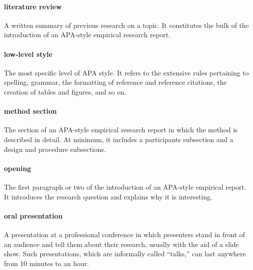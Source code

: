 \documentclass[
]{krantz}
\begin{document}
\hypertarget{literature-review}{%
\paragraph*{literature review}\label{literature-review}}

A written summary of previous research on a topic. It constitutes the bulk of the introduction of an APA-style empirical research report.

\hypertarget{low-level-style}{%
\paragraph*{low-level style}\label{low-level-style}}

The most specific level of APA style. It refers to the extensive rules pertaining to spelling, grammar, the formatting of reference and reference citations, the creation of tables and figures, and so on.

\hypertarget{method-section}{%
\paragraph*{method section}\label{method-section}}

The section of an APA-style empirical research report in which the method is described in detail. At minimum, it includes a participants subsection and a design and procedure subsections.

\hypertarget{opening}{%
\paragraph*{opening}\label{opening}}

The first paragraph or two of the introduction of an APA-style empirical report. It introduces the research question and explains why it is interesting.

\hypertarget{oral-presentation}{%
\paragraph*{oral presentation}\label{oral-presentation}}

A presentation at a professional conference in which presenters stand in front of an audience and tell them about their research, usually with the aid of a slide show. Such presentations, which are informally called ``talks,'' can last anywhere from 10 minutes to an hour.
\end{document}
